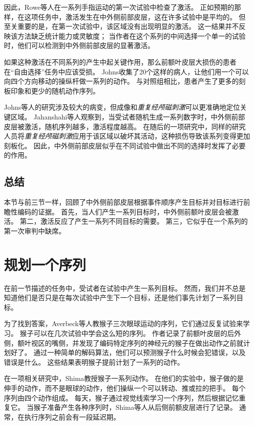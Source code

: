 因此，Rowe等人\cite{rowe2010action}在一系列手指运动的第一次试验中检查了激活。
正如预期的那样，在这项任务中，激活发生在中外侧前部皮层，这在许多试验中是平均的。
但至关重要的是，在第一次试验中，该区域没有出现明显的激活。
这一结果并不反映该方法缺乏统计能力或灵敏度；
当作者在这个系列的中间选择一个单一的试验时，他们可以检测到中外侧前部皮层的显著激活。


如果这种激活在不同系列的产生中起关键作用，那么前额叶皮层大损伤的患者在“自由选择”任务中应该受损。
Johns\cite{johns1996effects}收集了20个这样的病人，让他们用一个可以向四个方向移动的操纵杆做一系列的动作。
与对照组相比，患者产生了更多的刻板印象和更少的随机动作序列。


Johns等人的研究涉及较大的病变，但成像和\textit{重复经颅磁刺激}可以更准确地定位关键区域。
Jahanshahi等人\cite{jahanshahi2000role}观察到，当受试者随机生成一系列数字时，中外侧前部皮层被激活，随机序列越多，激活程度越高。
在随后的一项研究中\cite{jahanshahi1998left}，同样的研究人员将\textit{重复经颅磁刺激}应用于该区域以破坏其活动，这种损伤导致该系列变得更加刻板化。
因此，中外侧前部皮层似乎在不同试验中做出不同的选择时发挥了必要的作用。



\subsection{总结}

本节与前三节一样，回顾了中外侧前部皮层根据事件顺序产生目标并对目标进行前瞻性编码的证据。
首先，当人们产生一系列目标时，中外侧前额叶皮层会被激活。
第二，激活反应了产生一系列不同目标的需要。
第三，它似乎在一个系列的第一次审判中缺席。



\section{规划一个序列}

在前一节描述的任务中，受试者在试验中产生一系列目标。
然而，我们并不总是知道他们是否只是在每次试验中产生下一个目标，还是他们事先计划了一系列目标。


为了找到答案，Averbeck等人\cite{averbeck2006activity}教猴子三次眼球运动的序列，它们通过反复试验来学习。
猴子可以在几次试验中学会这么短的序列。
作者记录了前额叶皮层的后外侧，额叶视区的嘴侧，并发现了编码特定序列的神经元的猴子在做出动作之前就计划好了。
通过一种简单的解码算法，他们可以预测猴子什么时候会犯错误，以及错误是什么。
这些结果表明猴子提前计划了一系列的动作。


在一项相关研究中，Shima\cite{shima2007categorization}教授猴子一系列动作。
在他们的实验中，猴子做的是伸手的动作，而不是眼球的动作，他们操纵一个可以转动、推或拉的把手。
每个序列由四个动作组成。
每天，猴子通过视觉线索学习一个序列，然后根据记忆重复它。
当猴子准备产生各种序列时，Shima等人从后侧前额皮层进行了记录。
通常，在执行序列之前会有一段延迟期。


